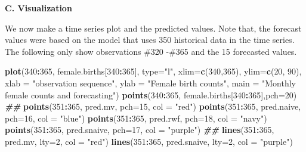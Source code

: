 \documentclass[
]{book}
\newenvironment{Shaded}{\begin{snugshade}}{\end{snugshade}}
\newcommand{\AttributeTok}[1]{\textcolor[rgb]{0.13,0.29,0.53}{#1}}
\newcommand{\DecValTok}[1]{\textcolor[rgb]{0.00,0.00,0.81}{#1}}
\newcommand{\DocumentationTok}[1]{\textcolor[rgb]{0.56,0.35,0.01}{\textbf{\textit{#1}}}}
\newcommand{\FunctionTok}[1]{\textcolor[rgb]{0.13,0.29,0.53}{\textbf{#1}}}
\newcommand{\NormalTok}[1]{#1}
\newcommand{\SpecialCharTok}[1]{\textcolor[rgb]{0.81,0.36,0.00}{\textbf{#1}}}
\newcommand{\StringTok}[1]{\textcolor[rgb]{0.31,0.60,0.02}{#1}}
\begin{document}
\textbf{C. Visualization}

We now make a time series plot and the predicted values. Note that, the forecast values were based on the model that uses 350 historical data in the time series. The following only show observations \#320 -\#365 and the 15 forecasted values.

\begin{Shaded}
\begin{Highlighting}[]
\FunctionTok{plot}\NormalTok{(}\DecValTok{340}\SpecialCharTok{:}\DecValTok{365}\NormalTok{, female.births[}\DecValTok{340}\SpecialCharTok{:}\DecValTok{365}\NormalTok{], }\AttributeTok{type=}\StringTok{"l"}\NormalTok{, }\AttributeTok{xlim=}\FunctionTok{c}\NormalTok{(}\DecValTok{340}\NormalTok{,}\DecValTok{365}\NormalTok{), }\AttributeTok{ylim=}\FunctionTok{c}\NormalTok{(}\DecValTok{20}\NormalTok{, }\DecValTok{90}\NormalTok{),}
     \AttributeTok{xlab =} \StringTok{"observation sequence"}\NormalTok{,}
     \AttributeTok{ylab =} \StringTok{"Female birth counts"}\NormalTok{,}
     \AttributeTok{main =} \StringTok{"Monthly female counts and forecasting"}\NormalTok{)}
\FunctionTok{points}\NormalTok{(}\DecValTok{340}\SpecialCharTok{:}\DecValTok{365}\NormalTok{, female.births[}\DecValTok{340}\SpecialCharTok{:}\DecValTok{365}\NormalTok{],}\AttributeTok{pch=}\DecValTok{20}\NormalTok{)}
\DocumentationTok{\#\#}
\FunctionTok{points}\NormalTok{(}\DecValTok{351}\SpecialCharTok{:}\DecValTok{365}\NormalTok{, pred.mv, }\AttributeTok{pch=}\DecValTok{15}\NormalTok{, }\AttributeTok{col =} \StringTok{"red"}\NormalTok{)}
\FunctionTok{points}\NormalTok{(}\DecValTok{351}\SpecialCharTok{:}\DecValTok{365}\NormalTok{, pred.naive, }\AttributeTok{pch=}\DecValTok{16}\NormalTok{, }\AttributeTok{col =} \StringTok{"blue"}\NormalTok{)}
\FunctionTok{points}\NormalTok{(}\DecValTok{351}\SpecialCharTok{:}\DecValTok{365}\NormalTok{, pred.rwf, }\AttributeTok{pch=}\DecValTok{18}\NormalTok{, }\AttributeTok{col =} \StringTok{"navy"}\NormalTok{)}
\FunctionTok{points}\NormalTok{(}\DecValTok{351}\SpecialCharTok{:}\DecValTok{365}\NormalTok{, pred.snaive, }\AttributeTok{pch=}\DecValTok{17}\NormalTok{, }\AttributeTok{col =} \StringTok{"purple"}\NormalTok{)}
\DocumentationTok{\#\#}
\FunctionTok{lines}\NormalTok{(}\DecValTok{351}\SpecialCharTok{:}\DecValTok{365}\NormalTok{, pred.mv, }\AttributeTok{lty=}\DecValTok{2}\NormalTok{, }\AttributeTok{col =} \StringTok{"red"}\NormalTok{)}
\FunctionTok{lines}\NormalTok{(}\DecValTok{351}\SpecialCharTok{:}\DecValTok{365}\NormalTok{, pred.snaive, }\AttributeTok{lty=}\DecValTok{2}\NormalTok{, }\AttributeTok{col =} \StringTok{"purple"}\NormalTok{)}

\end{Highlighting}
\end{Shaded}
\end{document}
